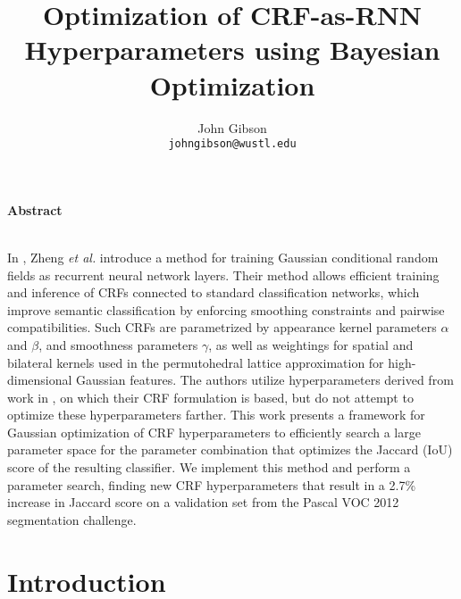 \documentclass[10pt,twocolumn,letterpaper]{article}
\date{}
\title{Optimization of CRF-as-RNN Hyperparameters using Bayesian Optimization}
\author{%
John Gibson\\
{\tt johngibson@wustl.edu}
}
\begin{document}
\maketitle

\begin{center}\textbf{Abstract}\\~\\\parbox{0.475\textwidth}{\em

    In \cite{Zheng_2015}, Zheng \textit{et al.} introduce a method for training Gaussian conditional random fields as recurrent neural network layers. 
    Their method allows efficient training and inference of CRFs connected to standard classification networks, which improve semantic classification
    by enforcing smoothing constraints and pairwise compatibilities. Such CRFs are parametrized by appearance kernel parameters $\alpha$ and $\beta$, 
    and smoothness parameters $\gamma$, as well as weightings for spatial and bilateral kernels used in the permutohedral lattice approximation for 
    high-dimensional Gaussian features. The authors utilize hyperparameters derived from work in \cite{krhenbhl2012efficient}, on which their CRF 
    formulation is based, but do not attempt to optimize these hyperparameters farther. This work presents a framework for Gaussian optimization 
    of CRF hyperparameters to efficiently search a large parameter space for the parameter combination that optimizes the Jaccard (IoU) score of the 
    resulting classifier. We implement this method and perform a parameter search, finding new CRF hyperparameters that result in a 2.7\% increase 
    in Jaccard score on a validation set from the Pascal VOC 2012 segmentation challenge.

}\end{center}

\bigskip

\section{Introduction}
\end{document}
